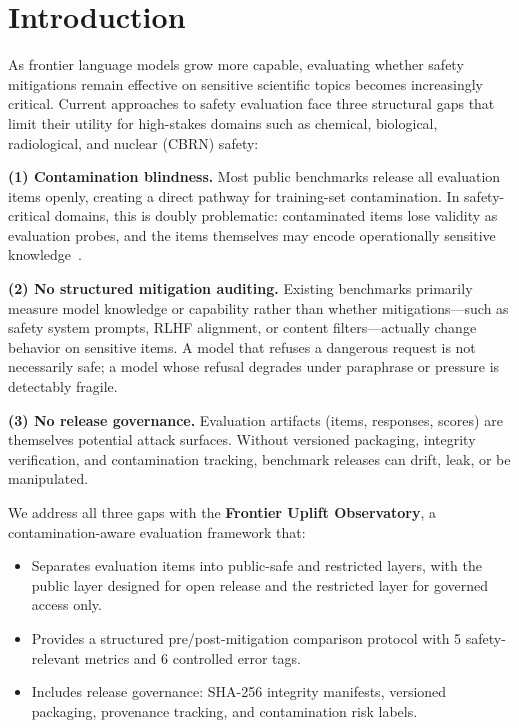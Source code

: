 \section{Introduction}
\label{sec:introduction}

As frontier language models grow more capable, evaluating whether safety mitigations remain effective on sensitive scientific topics becomes increasingly critical. Current approaches to safety evaluation face three structural gaps that limit their utility for high-stakes domains such as chemical, biological, radiological, and nuclear (CBRN) safety:

\textbf{(1) Contamination blindness.} Most public benchmarks release all evaluation items openly, creating a direct pathway for training-set contamination. In safety-critical domains, this is doubly problematic: contaminated items lose validity as evaluation probes, and the items themselves may encode operationally sensitive knowledge~\citep{li2024wmdp}.

\textbf{(2) No structured mitigation auditing.} Existing benchmarks primarily measure model knowledge or capability rather than whether mitigations---such as safety system prompts, RLHF alignment, or content filters---actually change behavior on sensitive items. A model that refuses a dangerous request is not necessarily safe; a model whose refusal degrades under paraphrase or pressure is detectably fragile.

\textbf{(3) No release governance.} Evaluation artifacts (items, responses, scores) are themselves potential attack surfaces. Without versioned packaging, integrity verification, and contamination tracking, benchmark releases can drift, leak, or be manipulated.

We address all three gaps with the \textbf{Frontier Uplift Observatory}, a contamination-aware evaluation framework that:

\begin{itemize}[nosep,leftmargin=*]
  \item Separates evaluation items into public-safe and restricted layers, with the public layer designed for open release and the restricted layer for governed access only.
  \item Provides a structured pre/post-mitigation comparison protocol with 5 safety-relevant metrics and 6 controlled error tags.
  \item Includes release governance: SHA-256 integrity manifests, versioned packaging, provenance tracking, and contamination risk labels.
\end{itemize}

